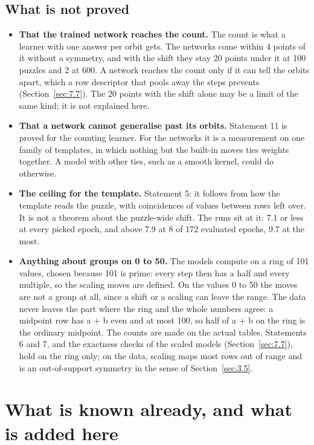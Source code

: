 \subsection{What is not proved}\label{sec:3.7.1}

\begin{itemize}
\item \textbf{That the trained network reaches the count.} The count is what a learner with one answer per orbit gets. The networks come within 4 points of it without a symmetry, and with the shift they stay 20 points under it at 100 puzzles and 2 at 600. A network reaches the count only if it can tell the orbits apart, which a row descriptor that pools away the steps prevents (Section~\ref{sec:7.7}). The 20 points with the shift alone may be a limit of the same kind; it is not explained here.
\item \textbf{That a network cannot generalise past its orbits.} Statement 11 is proved for the counting learner. For the networks it is a measurement on one family of templates, in which nothing but the built-in moves ties weights together. A model with other ties, such as a smooth kernel, could do otherwise.
\item \textbf{The ceiling for the template.} Statement 5: it follows from how the template reads the puzzle, with coincidences of values between rows left over. It is not a theorem about the puzzle-wide shift. The runs sit at it: 7.1 or less at every picked epoch, and above 7.9 at 8 of 172 evaluated epochs, 9.7 at the most.
\item \textbf{Anything about groups on 0 to 50.} The models compute on a ring of 101 values, chosen because 101 is prime: every step then has a half and every multiple, so the scaling moves are defined. On the values 0 to 50 the moves are not a group at all, since a shift or a scaling can leave the range. The data never leaves the part where the ring and the whole numbers agree: a midpoint row has a + b even and at most 100, so half of a + b on the ring is the ordinary midpoint. The counts are made on the actual tables. Statements 6 and 7, and the exactness checks of the scaled models (Section~\ref{sec:7.7}), hold on the ring only; on the data, scaling maps most rows out of range and is an out-of-support symmetry in the sense of Section~\ref{sec:3.5}.
\end{itemize}

\section{What is known already, and what is added here}\label{sec:3.8}

